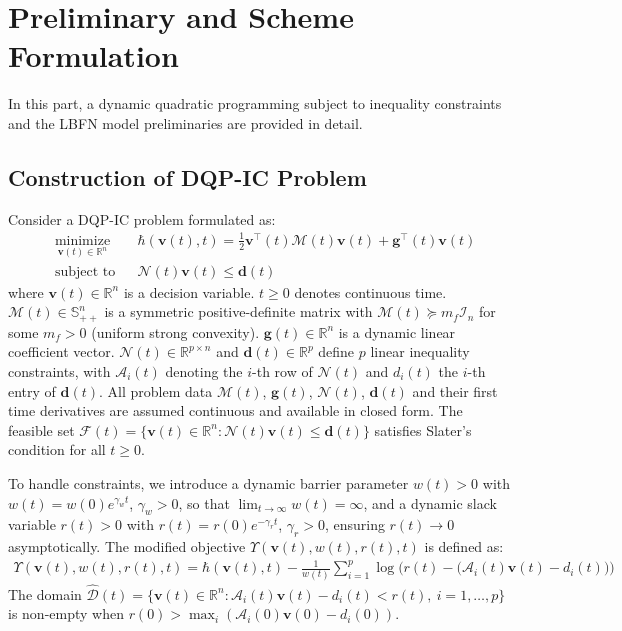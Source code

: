 \documentclass[fleqn,10pt]{wlscirep}
\begin{document}
\section{Preliminary and Scheme Formulation}
In this part, a dynamic quadratic programming subject to inequality constraints and the LBFN model preliminaries are provided in detail.

\subsection{Construction of DQP-IC Problem}
Consider a DQP-IC problem formulated as:
\begin{equation}
\begin{aligned}
& \underset{\bm{v}(t) \in \mathbb{R}^n}{\text{minimize}} & & \hbar(\bm{v}(t), t) = \frac{1}{2} \bm{v}^\top(t) \mathcal{M}(t) \bm{v}(t) + \bm{g}^\top(t)\bm{v}(t) \\
& \text{subject to} & & \mathcal{N}(t) \bm{v}(t) \leq \bm{d}(t)
\end{aligned}
\label{eq:problem}
\end{equation}
where $\bm{v}(t) \in \mathbb{R}^n$ is a decision variable. $t \geq 0$ denotes continuous time. $\mathcal{M}(t) \in \mathbb{S}^n_{++}$ is a symmetric positive-definite matrix with $\mathcal{M}(t) \succeq m_f \mathcal{I}_n$ for some $m_f > 0$ (uniform strong convexity). $\bm{g}(t) \in \mathbb{R}^n$ is a dynamic linear coefficient vector. $\mathcal{N}(t) \in \mathbb{R}^{p \times n}$ and $\bm{d}(t) \in \mathbb{R}^p$ define $p$ linear inequality constraints, with $\mathcal{A}_i(t)$ denoting the $i$-th row of $\mathcal{N}(t)$ and $d_i(t)$ the $i$-th entry of $\bm{d}(t)$. All problem data $\mathcal{M}(t)$, $\bm{g}(t)$, $\mathcal{N}(t)$, $\bm{d}(t)$ and their first time derivatives are assumed continuous and available in closed form. The feasible set $\mathcal{F}(t) = \{\bm{v}(t) \in \mathbb{R}^n : \mathcal{N}(t) \bm{v}(t) \leq \bm{d}(t)\}$ satisfies Slater's condition for all $t \geq 0$.

To handle constraints, we introduce a dynamic barrier parameter $w(t) > 0$ with $w(t) = w(0)e^{\gamma_w t}$, $\gamma_w>0$, so that $\lim_{t \to \infty} w(t) = \infty$, and a dynamic slack variable $r(t) > 0$ with $r(t) = r(0)e^{-\gamma_r t}$, $\gamma_r > 0$, ensuring $r(t) \to 0$ asymptotically.
The modified objective $\Upsilon(\bm{v}(t), w(t), r(t), t)$ is defined as:
\begin{equation}
\begin{aligned}
\Upsilon(\bm{v}(t), w(t), r(t), t) = \hbar(\bm{v}(t), t) - \frac{1}{w(t)} \sum_{i=1}^p \log \bigg( r(t) - \big( \mathcal{A}_i(t) \bm{v}(t) - d_i(t) \big) \bigg)
\end{aligned}
\label{eq:psi}
\end{equation}
The domain $\widehat{\mathcal{D}}(t) = \{ \bm{v}(t) \in \mathbb{R}^n : \mathcal{A}_i(t) \bm{v}(t) - d_i(t) < r(t),\ i=1,\dots,p \}$ is non-empty when $r(0) > \max_i (\mathcal{A}_i(0) \bm{v}(0) - d_i(0))$.
\end{document}
